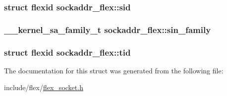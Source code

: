 \subsubsection[{\texorpdfstring{sid}{sid}}]{\setlength{\rightskip}{0pt plus 5cm}struct {\bf flexid} sockaddr\+\_\+flex\+::sid}\hypertarget{structsockaddr__flex_ae2d332f61042d379e3521f7e42603037}{}\label{structsockaddr__flex_ae2d332f61042d379e3521f7e42603037}
\subsubsection[{\texorpdfstring{sin\+\_\+family}{sin_family}}]{\setlength{\rightskip}{0pt plus 5cm}\+\_\+\+\_\+kernel\+\_\+sa\+\_\+family\+\_\+t sockaddr\+\_\+flex\+::sin\+\_\+family}\hypertarget{structsockaddr__flex_a0bebb0734429c3e6a548fc61de27c9c0}{}\label{structsockaddr__flex_a0bebb0734429c3e6a548fc61de27c9c0}
\subsubsection[{\texorpdfstring{tid}{tid}}]{\setlength{\rightskip}{0pt plus 5cm}struct {\bf flexid} sockaddr\+\_\+flex\+::tid}\hypertarget{structsockaddr__flex_a841742293b927751d2c0f8c48d7a5828}{}\label{structsockaddr__flex_a841742293b927751d2c0f8c48d7a5828}


The documentation for this struct was generated from the following file\+:\begin{DoxyCompactItemize}
\item 
include/flex/\hyperlink{flex__socket_8h}{flex\+\_\+socket.\+h}\end{DoxyCompactItemize}
